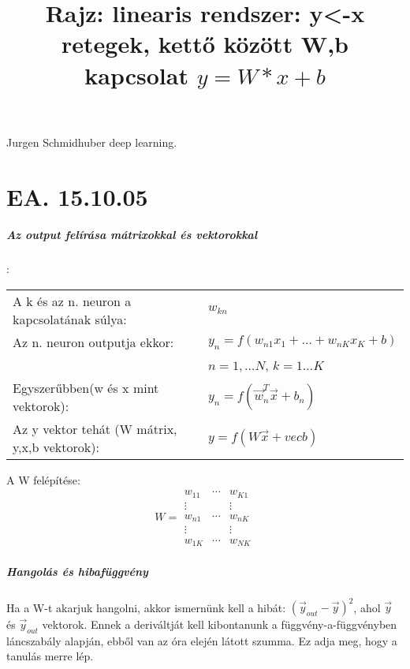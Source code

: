 \documentclass[10pt,a4paper]{report}
\begin{document}
\paragraph{}
Jurgen Schmidhuber deep learning.

\chapter{EA. 15.10.05}
\paragraph{Az output felírása mátrixokkal és vektorokkal}:\\
\begin{tabular}{ll}
A k és az n. neuron a kapcsolatának súlya: &$ w_{kn} $\\
Az n. neuron outputja ekkor: &$y_n=f(w_{n1}x_1+\dots + w_{nK}x_K+b)$ \\ &$n=1,\dots N$, $k=1\dots K$\\
Egyszerűbben(w és x mint vektorok): &$y_n = f(\vec{w}_n^T\vec{x}+b_n)$\\
Az y vektor tehát (W mátrix, y,x,b vektorok): &$y = f(W\vec{x} + vec{b}) $\\
\end{tabular}

A W felépítése: 
\begin{equation}
W = \begin{matrix}
w_{1 1}&\cdots &w_{K 1}\\
\vdots & &\vdots \\ 
w_{n1} &\cdots& w_{nK} \\
\vdots & &\vdots \\ 
w_{1K} &\cdots &w_{NK}
\end{matrix}
\end{equation}
\paragraph{Hangolás és hibafüggvény}
Ha a W-t akarjuk hangolni, akkor ismernünk kell a hibát: $(\vec{y}_{out} - \vec{y})^2$, ahol $\vec{y}$ és $\vec{y}_{out}$ vektorok. Ennek a deriváltját kell kibontanunk a függvény-a-függvényben láncszabály alapján, ebből van az óra elején látott szumma. Ez adja meg, hogy a tanulás merre lép. 
\begin{figure}[h]
\title{Rajz: linearis rendszer: y<-x retegek, kettő között W,b kapcsolat $y=W*x+b$}
\end{figure}
\end{document}
